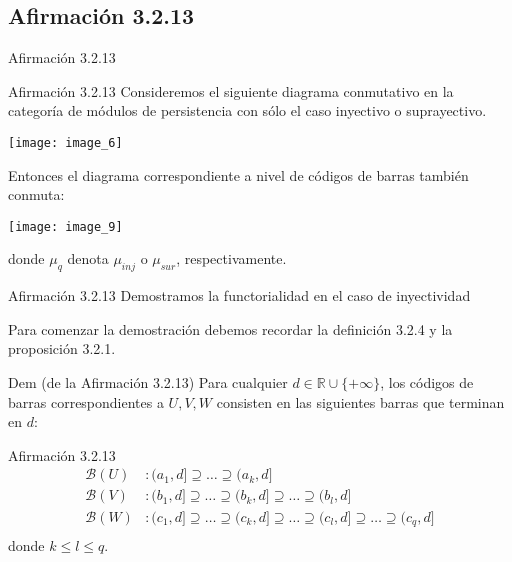 \documentclass{beamer}
\begin{document}
\subsection{Afirmación 3.2.13}
\begin{frame}{Afirmación 3.2.13}
    \begin{block}{Afirmación 3.2.13}
        Consideremos el siguiente diagrama conmutativo en la categoría de módulos de persistencia con sólo el caso inyectivo o suprayectivo. 
    \end{block}
    \pause
    
    \texttt{[image: image\_6]}
    \pause
    
    Entonces el diagrama correspondiente a nivel de códigos de barras también conmuta:
    \pause

    \texttt{[image: image\_9]}
    \pause
    
    donde $\mu_{q}$ denota $\mu_{inj}$ o $\mu_{sur}$, respectivamente.
\end{frame}


\begin{frame}{Afirmación 3.2.13}
    Demostramos la functorialidad en el caso de inyectividad
    \newline
    \pause 
    
    Para comenzar la demostración debemos recordar la definición 3.2.4 y la proposición 3.2.1. 
    \newline
    \pause
    
    \begin{block}{Dem (de la Afirmación 3.2.13)}
        Para cualquier $d \in \mathbb{R}\cup \{+\infty\}$, los códigos de barras correspondientes a $U, V, W$ consisten en las siguientes barras que terminan en $d$:
    \end{block}
\end{frame}

\begin{frame}{Afirmación 3.2.13}
    \begin{align*} 
        \mathcal{B}(U) &: (a_{1},d] \supseteq \ldots \supseteq (a_{k},d]\\
        \mathcal{B}(V) &: (b_{1},d] \supseteq \ldots \supseteq (b_{k},d] \supseteq \ldots \supseteq (b_{l},d]\\
        \mathcal{B}(W) &: (c_{1},d] \supseteq \ldots \supseteq (c_{k},d] \supseteq \ldots \supseteq (c_{l},d] \supseteq \ldots \supseteq (c_{q},d]\\
    \end{align*}
    donde $k \leq l \leq q$. 
\end{frame}
\end{document}

